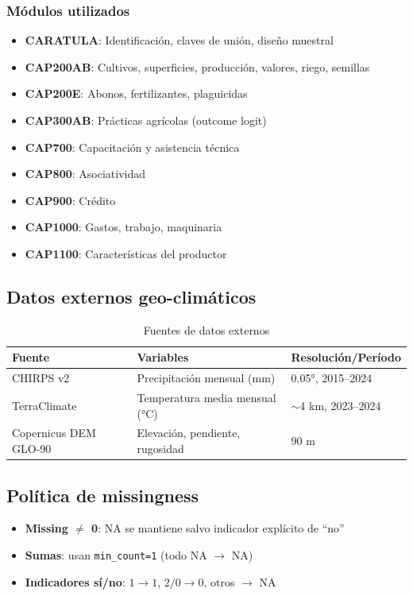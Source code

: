 \documentclass[11pt,a4paper]{article}
\begin{document}
\subsubsection{Módulos utilizados}
\begin{itemize}
    \item \textbf{CARATULA}: Identificación, claves de unión, diseño muestral
    \item \textbf{CAP200AB}: Cultivos, superficies, producción, valores, riego, semillas
    \item \textbf{CAP200E}: Abonos, fertilizantes, plaguicidas
    \item \textbf{CAP300AB}: Prácticas agrícolas (outcome logit)
    \item \textbf{CAP700}: Capacitación y asistencia técnica
    \item \textbf{CAP800}: Asociatividad
    \item \textbf{CAP900}: Crédito
    \item \textbf{CAP1000}: Gastos, trabajo, maquinaria
    \item \textbf{CAP1100}: Características del productor
\end{itemize}

\subsection{Datos externos geo-climáticos}

\begin{table}[H]
\centering
\caption{Fuentes de datos externos}
\label{tab:external_data}
\begin{threeparttable}
\small
\begin{tabular}{p{3cm}p{5cm}p{5cm}}
\toprule
\textbf{Fuente} & \textbf{Variables} & \textbf{Resolución/Período} \\
\midrule
CHIRPS v2 & Precipitación mensual (mm) & 0.05°, 2015--2024 \\
TerraClimate & Temperatura media mensual (°C) & $\sim$4 km, 2023--2024 \\
Copernicus DEM GLO-90 & Elevación, pendiente, rugosidad & 90 m \\
\bottomrule
\end{tabular}
\end{threeparttable}
\end{table}

\subsection{Política de missingness}
\begin{itemize}
    \item \textbf{Missing $\neq$ 0}: NA se mantiene salvo indicador explícito de ``no''
    \item \textbf{Sumas}: usan \texttt{min\_count=1} (todo NA $\to$ NA)
    \item \textbf{Indicadores sí/no}: $1 \to 1$, $2/0 \to 0$, otros $\to$ NA
\end{itemize}
\end{document}
